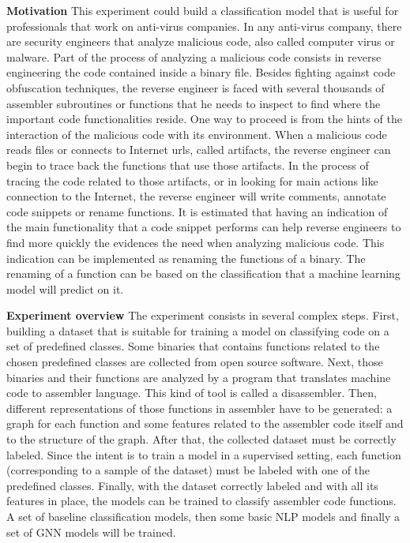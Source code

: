 \textbf{Motivation}
This experiment could build a classification model that is useful for professionals that work on anti-virus companies. In any anti-virus company, there are security engineers that analyze malicious code, also called computer virus or malware. Part of the process of analyzing a malicious code consists in reverse engineering the code contained inside a binary file. Besides fighting against code obfuscation techniques, the reverse engineer is faced with several thousands of assembler subroutines or functions that he needs to inspect to find where the important code functionalities reside. One way to proceed is from the hints of the interaction of the malicious code with its environment. When a malicious code reads files or connects to Internet urls, called artifacts, the reverse engineer can begin to trace back the functions that use those artifacts. In the process of tracing the code related to those artifacts, or in looking for main actions like connection to the Internet, the reverse engineer will write comments, annotate code snippets or rename functions.
It is estimated that having an indication of the main functionality that a code snippet performs can help reverse engineers to find more quickly the evidences the need when analyzing malicious code. This indication can be implemented as renaming the functions of a binary. The renaming of a function can be based on the classification that a machine learning model will predict on it.



\textbf{Experiment overview}
The experiment consists in several complex steps.
First, building a dataset that is suitable for training a model on classifying code on a set of predefined classes. Some binaries that contains functions related to the chosen predefined classes are collected from open source software.  
Next, those binaries and their functions are analyzed by a program that translates machine code to assembler language. This kind of tool is called a disassembler.
Then, different representations of those functions in assembler have to be generated: a graph for each function and some features related to the assembler code itself and to the structure of the graph.
After that, the collected dataset must be correctly labeled. Since the intent is to train a model in a supervised setting, each function (corresponding to a sample of the dataset) must be labeled with one of the predefined classes.
Finally, with the dataset correctly labeled and with all its features in place, the models can be trained to classify assembler code functions. A set of baseline classification models, then some basic NLP models and finally a set of GNN models will be trained. 


